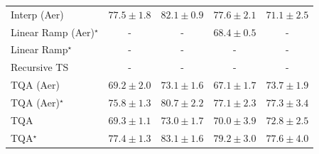 \begin{tabular}{l|cccc|}
Interp (Aer) & {\cellcolor[HTML]{FE9B2B}} \color[HTML]{000000} $77.5\pm 1.8$ & {\cellcolor[HTML]{D65808}} \color[HTML]{F1F1F1} $82.1\pm 0.9$ & {\cellcolor[HTML]{FE9A2A}} \color[HTML]{000000} $77.6\pm 2.1$ & {\cellcolor[HTML]{FEEDA6}} \color[HTML]{000000} $71.1\pm 2.5$ \\
Linear Ramp (Aer)$^\star$ & {\cellcolor[HTML]{000000}} \color[HTML]{F1F1F1} {\cellcolor{white}} \color{black} - & {\cellcolor[HTML]{000000}} \color[HTML]{F1F1F1} {\cellcolor{white}} \color{black} - & {\cellcolor[HTML]{FFFBD2}} \color[HTML]{000000} $68.4\pm 0.5$ & {\cellcolor[HTML]{000000}} \color[HTML]{F1F1F1} {\cellcolor{white}} \color{black} - \\
Linear Ramp$^\star$ & {\cellcolor[HTML]{000000}} \color[HTML]{F1F1F1} {\cellcolor{white}} \color{black} - & {\cellcolor[HTML]{000000}} \color[HTML]{F1F1F1} {\cellcolor{white}} \color{black} - & {\cellcolor[HTML]{000000}} \color[HTML]{F1F1F1} {\cellcolor{white}} \color{black} - & {\cellcolor[HTML]{000000}} \color[HTML]{F1F1F1} {\cellcolor{white}} \color{black} - \\
Recursive TS & {\cellcolor[HTML]{000000}} \color[HTML]{F1F1F1} {\cellcolor{white}} \color{black} - & {\cellcolor[HTML]{000000}} \color[HTML]{F1F1F1} {\cellcolor{white}} \color{black} - & {\cellcolor[HTML]{000000}} \color[HTML]{F1F1F1} {\cellcolor{white}} \color{black} - & {\cellcolor[HTML]{000000}} \color[HTML]{F1F1F1} {\cellcolor{white}} \color{black} - \\
TQA (Aer) & {\cellcolor[HTML]{FFF9C5}} \color[HTML]{000000} $69.2\pm 2.0$ & {\cellcolor[HTML]{FEDB80}} \color[HTML]{000000} $73.1\pm 1.6$ & {\cellcolor[HTML]{FFFFE5}} \color[HTML]{000000} $67.1\pm 1.7$ & {\cellcolor[HTML]{FED36F}} \color[HTML]{000000} $73.7\pm 1.9$ \\
TQA (Aer)$^\star$ & {\cellcolor[HTML]{FEB744}} \color[HTML]{000000} $75.8\pm 1.3$ & {\cellcolor[HTML]{E66A11}} \color[HTML]{F1F1F1} $80.7\pm 2.2$ & {\cellcolor[HTML]{FEA231}} \color[HTML]{000000} $77.1\pm 2.3$ & {\cellcolor[HTML]{FE9F2E}} \color[HTML]{000000} $77.3\pm 3.4$ \\
TQA & {\cellcolor[HTML]{FFF8C4}} \color[HTML]{000000} $69.3\pm 1.1$ & {\cellcolor[HTML]{FEDC82}} \color[HTML]{000000} $73.0\pm 1.7$ & {\cellcolor[HTML]{FFF5B8}} \color[HTML]{000000} $70.0\pm 3.9$ & {\cellcolor[HTML]{FEDE86}} \color[HTML]{000000} $72.8\pm 2.5$ \\
TQA$^\star$ & {\cellcolor[HTML]{FE9E2D}} \color[HTML]{000000} $77.4\pm 1.3$ & {\cellcolor[HTML]{C84A02}} \color[HTML]{F1F1F1} $83.1\pm 1.6$ & {\cellcolor[HTML]{F4811D}} \color[HTML]{F1F1F1} $79.2\pm 3.0$ & {\cellcolor[HTML]{FE9A2A}} \color[HTML]{000000} $77.6\pm 4.0$ \\

\end{tabular}
